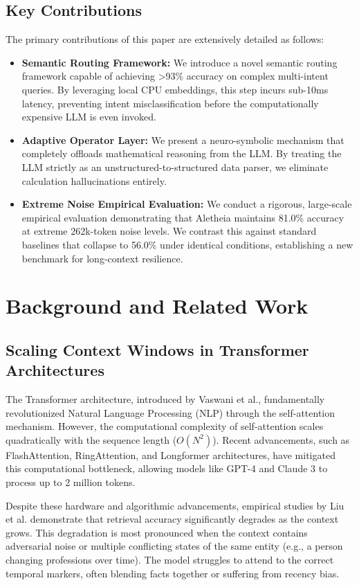 \documentclass[journal,10pt]{IEEEtran}
\begin{document}
\subsection{Key Contributions}
The primary contributions of this paper are extensively detailed as follows:
\begin{itemize}
    \item \textbf{Semantic Routing Framework:} We introduce a novel semantic routing framework capable of achieving >93\% accuracy on complex multi-intent queries. By leveraging local CPU embeddings, this step incurs sub-10ms latency, preventing intent misclassification before the computationally expensive LLM is even invoked.
    \item \textbf{Adaptive Operator Layer:} We present a neuro-symbolic mechanism that completely offloads mathematical reasoning from the LLM. By treating the LLM strictly as an unstructured-to-structured data parser, we eliminate calculation hallucinations entirely.
    \item \textbf{Extreme Noise Empirical Evaluation:} We conduct a rigorous, large-scale empirical evaluation demonstrating that Aletheia maintains 81.0\% accuracy at extreme 262k-token noise levels. We contrast this against standard baselines that collapse to 56.0\% under identical conditions, establishing a new benchmark for long-context resilience.
\end{itemize}


\section{Background and Related Work}

\subsection{Scaling Context Windows in Transformer Architectures}
The Transformer architecture, introduced by Vaswani et al., fundamentally revolutionized Natural Language Processing (NLP) through the self-attention mechanism. However, the computational complexity of self-attention scales quadratically with the sequence length ($O(N^2)$). Recent advancements, such as FlashAttention, RingAttention, and Longformer architectures, have mitigated this computational bottleneck, allowing models like GPT-4 and Claude 3 to process up to 2 million tokens. 

Despite these hardware and algorithmic advancements, empirical studies by Liu et al. demonstrate that retrieval accuracy significantly degrades as the context grows. This degradation is most pronounced when the context contains adversarial noise or multiple conflicting states of the same entity (e.g., a person changing professions over time). The model struggles to attend to the correct temporal markers, often blending facts together or suffering from recency bias.
\end{document}
